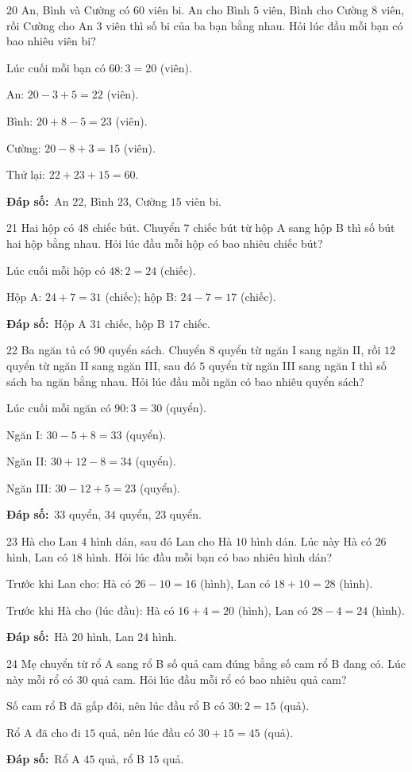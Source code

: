 \documentclass[11pt]{article}
\newif\ifsol \solfalse
\providecommand{\AnsWord}{Đáp số}
\newcommand{\dapso}[1]{\par\textbf{\AnsWord:}\ #1}
\newcommand{\probsol}[1]{%
  \begin{lrbox}{\solmeasure}\begin{minipage}{\dimexpr\linewidth-24pt\relax}#1\end{minipage}\end{lrbox}%
  \ifsol
    \begin{solbox}#1\end{solbox}%
  \else
    \setlength{\solht}{\dimexpr\ht\solmeasure+\dp\solmeasure+0.85cm\relax}%
    \ifdim\solht<1.35cm\setlength{\solht}{1.35cm}\fi
    \begin{tcolorbox}[colback=white,colframe=Line,boxrule=0.8pt,arc=5pt,
      left=8pt,right=8pt,top=4pt,bottom=4pt,height=\solht]{\footnotesize\color{Slate}\itshape\WorkWord}\end{tcolorbox}%
  \fi}
\newcommand{\gap}{\vspace{0.3cm}}
\def\WorkWord{Bài làm:}
\def\AnsWord{Đáp số}
\begin{document}
\gap
\begin{probbox}{20}{\relax}
An, Bình và Cường có $60$ viên bi. An cho Bình $5$ viên, Bình cho Cường $8$ viên, rồi Cường cho An $3$ viên thì số bi của ba bạn bằng nhau. Hỏi lúc đầu mỗi bạn có bao nhiêu viên bi?
\end{probbox}
\probsol{
Lúc cuối mỗi bạn có $60:3=20$ (viên).\par
An: $20-3+5=22$ (viên).\par Bình: $20+8-5=23$ (viên).\par Cường: $20-8+3=15$ (viên).\par Thử lại: $22+23+15=60$.
\dapso{An $22$, Bình $23$, Cường $15$ viên bi.}}
\gap
\begin{probbox}{21}{\relax}
Hai hộp có $48$ chiếc bút. Chuyển $7$ chiếc bút từ hộp A sang hộp B thì số bút hai hộp bằng nhau. Hỏi lúc đầu mỗi hộp có bao nhiêu chiếc bút?
\end{probbox}
\probsol{
Lúc cuối mỗi hộp có $48:2=24$ (chiếc).\par Hộp A: $24+7=31$ (chiếc); hộp B: $24-7=17$ (chiếc).
\dapso{Hộp A $31$ chiếc, hộp B $17$ chiếc.}}
\gap
\begin{probbox}{22}{\relax}
Ba ngăn tủ có $90$ quyển sách. Chuyển $8$ quyển từ ngăn I sang ngăn II, rồi $12$ quyển từ ngăn II sang ngăn III, sau đó $5$ quyển từ ngăn III sang ngăn I thì số sách ba ngăn bằng nhau. Hỏi lúc đầu mỗi ngăn có bao nhiêu quyển sách?
\end{probbox}
\probsol{
Lúc cuối mỗi ngăn có $90:3=30$ (quyển).\par
Ngăn I: $30-5+8=33$ (quyển).\par Ngăn II: $30+12-8=34$ (quyển).\par Ngăn III: $30-12+5=23$ (quyển).
\dapso{$33$ quyển, $34$ quyển, $23$ quyển.}}
\gap
\begin{probbox}{23}{\relax}
Hà cho Lan $4$ hình dán, sau đó Lan cho Hà $10$ hình dán. Lúc này Hà có $26$ hình, Lan có $18$ hình. Hỏi lúc đầu mỗi bạn có bao nhiêu hình dán?
\end{probbox}
\probsol{
Trước khi Lan cho: Hà có $26-10=16$ (hình), Lan có $18+10=28$ (hình).\par
Trước khi Hà cho (lúc đầu): Hà có $16+4=20$ (hình), Lan có $28-4=24$ (hình).
\dapso{Hà $20$ hình, Lan $24$ hình.}}
\gap
\begin{probbox}{24}{\relax}
Mẹ chuyển từ rổ A sang rổ B số quả cam đúng bằng số cam rổ B đang có. Lúc này mỗi rổ có $30$ quả cam. Hỏi lúc đầu mỗi rổ có bao nhiêu quả cam?
\end{probbox}
\probsol{
Số cam rổ B đã gấp đôi, nên lúc đầu rổ B có $30:2=15$ (quả).\par Rổ A đã cho đi $15$ quả, nên lúc đầu có $30+15=45$ (quả).
\dapso{Rổ A $45$ quả, rổ B $15$ quả.}}
\end{document}
